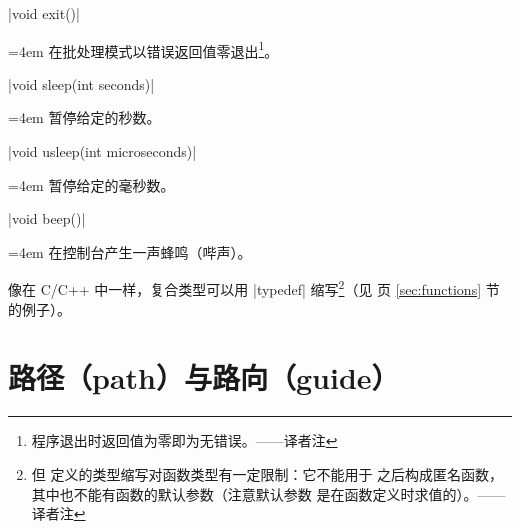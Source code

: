 \documentclass[nofonts,CJKnormalspaces]{ctexbook}[2009/05/20]
\makeatletter
\newenvironment{funclist}{\trivlist
  \parindent=0pt
\item[]
  \def\item{\medskip\par\leftskip=0pt}
  \def\go{\par\leftskip=4em}}
{\endtrivlist}
\newenvironment{typelist}{\itemize
  \let\old@item\@item
  \def\@item[##1]{\expandafter\old@item[\ttfamily\color{type!50!black}##1]}}
{\enditemize}
\newcommand\transnote[1]{\footnote{#1——译者注}}
\makeatother
\begin{document}
\begin{typelist}
\begin{funclist}
\item |void exit()| \go
  在批处理模式以错误返回值零退出\transnote{程序退出时返回值为零即为无错误。}。

\item |void sleep(int seconds)| \go
  暂停给定的秒数。

\item |void usleep(int microseconds)| \go
  暂停给定的毫秒数。

\item |void beep()| \go
  在控制台产生一声蜂鸣（哔声）。
\end{funclist}
\end{typelist}

像在 C/C++ 中一样，复合类型可以用 |typedef| 缩写\transnote{但
 定义的类型缩写对函数类型有一定限制：它不能用于
\inlinecode{new} 之后构成匿名函数，其中也不能有函数的默认参数（注意默认参数
是在函数定义时求值的）。}（见 \pageref{sec:functions} 页 \ref{sec:functions}
节的例子）。



\section{路径（path）与路向（guide）}
\label{sec:pathsandguides}
\end{document}

